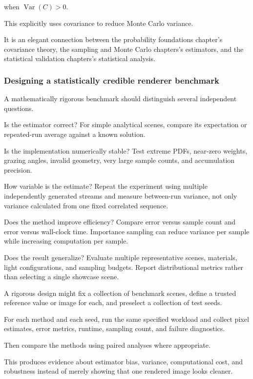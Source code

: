 when \(\operatorname{Var}(C)>0\).

This explicitly uses covariance to reduce Monte Carlo variance.

It is an elegant connection between the probability foundations chapter's covariance theory, the sampling and Monte Carlo chapters's estimators, and the statistical validation chapters's statistical analysis.

\subsubsection{Designing a statistically credible renderer benchmark}\label{designing-a-statistically-credible-renderer-benchmark}

A mathematically rigorous benchmark should distinguish several independent questions.

Is the estimator correct? For simple analytical scenes, compare its expectation or repeated-run average against a known solution.

Is the implementation numerically stable? Test extreme PDFs, near-zero weights, grazing angles, invalid geometry, very large sample counts, and accumulation precision.

How variable is the estimate? Repeat the experiment using multiple independently generated streams and measure between-run variance, not only variance calculated from one fixed correlated sequence.

Does the method improve efficiency? Compare error versus sample count and error versus wall-clock time. Importance sampling can reduce variance per sample while increasing computation per sample.

Does the result generalize? Evaluate multiple representative scenes, materials, light configurations, and sampling budgets. Report distributional metrics rather than selecting a single showcase scene.

A rigorous design might fix a collection of benchmark scenes, define a trusted reference value or image for each, and preselect a collection of test seeds.

For each method and each seed, run the same specified workload and collect pixel estimates, error metrics, runtime, sampling count, and failure diagnostics.

Then compare the methods using paired analyses where appropriate.

This produces evidence about estimator bias, variance, computational cost, and robustness instead of merely showing that one rendered image looks cleaner.

